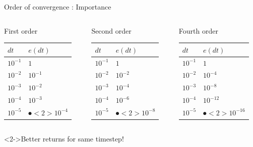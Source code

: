 \documentclass[presentation]{beamer}
\begin{document}
\begin{frame}[label={sec:org1bdf907}]{Order of convergence : Importance}
\begin{columns}
\begin{column}{0.32\columnwidth}
\begin{block}{First order}
\begin{center}
\begin{tabular}{ll}
\toprule
\(dt\) & \(e(dt)\)\\
\midrule
\(10^{-1}\) & \(1\)\\
\(10^{-2}\) & \(10^{-1}\)\\
\(10^{-3}\) & \(10^{-2}\)\\
\(10^{-4}\) & \(10^{-3}\)\\
\(10^{-5}\) & \(\spot<2>{10^{-4}}\)\\
\bottomrule
\end{tabular}
\end{center}
\end{block}
\end{column}

\begin{column}{0.32\columnwidth}
\begin{block}{Second order}
\begin{center}
\begin{tabular}{ll}
\toprule
\(dt\) & \(e(dt)\)\\
\midrule
\(10^{-1}\) & \(1\)\\
\(10^{-2}\) & \(10^{-2}\)\\
\(10^{-3}\) & \(10^{-4}\)\\
\(10^{-4}\) & \(10^{-6}\)\\
\(10^{-5}\) & \(\spot<2>{10^{-8}}\)\\
\bottomrule
\end{tabular}
\end{center}
\end{block}
\end{column}
\begin{column}{0.32\columnwidth}
\begin{block}{Fourth order}
\begin{center}
\begin{tabular}{ll}
\toprule
\(dt\) & \(e(dt)\)\\
\midrule
\(10^{-1}\) & \(1\)\\
\(10^{-2}\) & \(10^{-4}\)\\
\(10^{-3}\) & \(10^{-8}\)\\
\(10^{-4}\) & \(10^{-12}\)\\
\(10^{-5}\) & \(\spot<2>{10^{-16}}\)\\
\bottomrule
\end{tabular}
\end{center}
\end{block}
\end{column}
\end{columns}
\begin{alertblock}<2->{Better returns for same timestep!}
\end{alertblock}
\end{frame}
\end{document}
